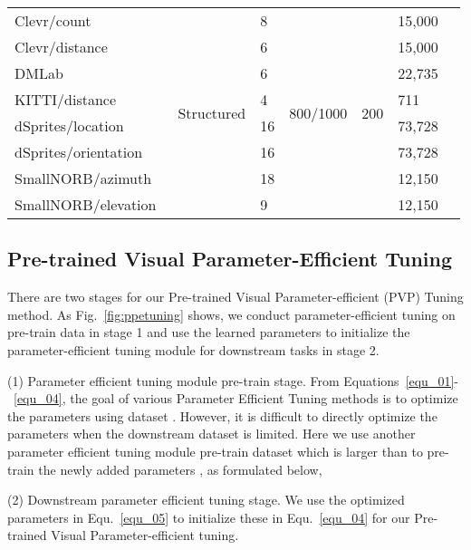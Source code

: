 \documentclass[10pt,journal,letterpaper,compsoc]{IEEEtran}
\begin{document}
\begin{table*}[h]
\begin{center}
{\begin{tabular}{l l  l l l l l}
\cmidrule{2-6}
  \quad Clevr/count~\cite{vtab_clevr} &\multirow{8}{*}{Structured}
  &8
  &\multirow{8}{*}{800/1000} &\multirow{8}{*}{200} &15,000
  \\
  \quad Clevr/distance~\cite{vtab_clevr} & &6 && &15,000
  \\
  \quad DMLab~\cite{vtab_dmlab} & &6 && &22,735
  \\
  \quad KITTI/distance~\cite{vtab_kitti_dist} & &4 && &711
  \\
  \quad dSprites/location~\cite{vtab_dsprites} & &16 && &73,728
  \\
  \quad dSprites/orientation~\cite{vtab_dsprites} & &16 && &73,728
  \\
  \quad SmallNORB/azimuth~\cite{vtab_smallnorb} & &18 && &12,150
  \\
  \quad SmallNORB/elevation~\cite{vtab_smallnorb} & &9 && &12,150
\\

\bottomrule\end{tabular} }\end{center}
\end{table*}
\setlength{\tabcolsep}{1.4pt}

\subsection{Pre-trained Visual Parameter-Efficient Tuning}

There are two stages for our Pre-trained Visual Parameter-efficient (PVP) Tuning method. As Fig.~\ref{fig:ppetuning} shows, we conduct parameter-efficient tuning on pre-train data in stage 1 and use the learned parameters to initialize the parameter-efficient tuning module for downstream tasks in stage 2.

(1) Parameter efficient tuning module pre-train stage. From Equations~\ref{equ_01}-~\ref{equ_04}, the goal of various Parameter Efficient Tuning methods is to optimize the parameters  using dataset . However, it is difficult to directly optimize the parameters  when the downstream dataset  is limited. Here we use another parameter efficient tuning module pre-train dataset  which is larger than  to pre-train the newly added parameters , as formulated below,



(2) Downstream parameter efficient tuning stage. We use the optimized parameters  in Equ.~\ref{equ_05} to initialize these in Equ.~\ref{equ_04} for our Pre-trained Visual Parameter-efficient tuning.
\end{document}
